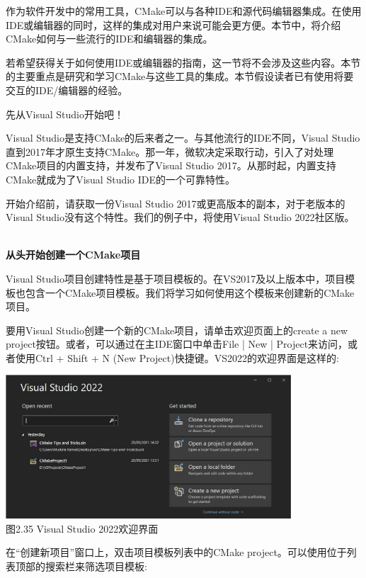 
作为软件开发中的常用工具，CMake可以与各种IDE和源代码编辑器集成。在使用IDE或编辑器的同时，这样的集成对用户来说可能会更方便。本节中，将介绍CMake如何与一些流行的IDE和编辑器的集成。

若希望获得关于如何使用IDE或编辑器的指南，这一节将不会涉及这些内容。本节的主要重点是研究和学习CMake与这些工具的集成。本节假设读者已有使用将要交互的IDE/编辑器的经验。

先从Visual Studio开始吧！


Visual Studio是支持CMake的后来者之一。与其他流行的IDE不同，Visual Studio直到2017年才原生支持CMake。那一年，微软决定采取行动，引入了对处理CMake项目的内置支持，并发布了Visual Studio 2017。从那时起，内置支持CMake就成为了Visual Studio IDE的一个可靠特性。

开始介绍前，请获取一份Visual Studio 2017或更高版本的副本，对于老版本的Visual Studio没有这个特性。我们的例子中，将使用Visual Studio 2022社区版。

\hspace*{\fill} \\ %
\noindent
\textbf{从头开始创建一个CMake项目}

Visual Studio项目创建特性是基于项目模板的。在VS2017及以上版本中，项目模板也包含一个CMake项目模板。我们将学习如何使用这个模板来创建新的CMake项目。

要用Visual Studio创建一个新的CMake项目，请单击欢迎页面上的create a new project按钮。或者，可以通过在主IDE窗口中单击File | New | Project来访问，或者使用Ctrl + Shift + N (New Project)快捷键。VS2022的欢迎界面是这样的:

\begin{center}
\includegraphics[width=0.8\textwidth]{content/1/chapter2/images/35.jpg}\\
图2.35 Visual Studio 2022欢迎界面
\end{center}

在“创建新项目”窗口上，双击项目模板列表中的CMake project。可以使用位于列表顶部的搜索栏来筛选项目模板:

